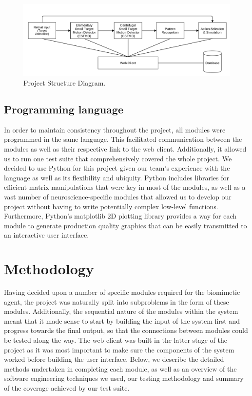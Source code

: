 \documentclass[a4paper,11pt]{article}
\begin{document}
\begin{figure}[h]
\centering
\includegraphics[scale = 0.35]{designblockdiagram2}
\caption{Project Structure Diagram.}
\end{figure}

\subsection{Programming language}
In order to maintain consistency throughout the project, all modules were programmed in the same language. This facilitated communication between the modules as well as their respective link to the web client. Additionally, it allowed us to run one test suite that comprehensively covered the whole project. We decided to use Python \cite{python} for this project given our team's experience with the language as well as its flexibility and ubiquity. Python includes libraries for efficient matrix manipulations that were key in most of the modules, as well as a vast number of neuroscience-specific modules that allowed us to develop our project without having to write potentially complex low-level functions. Furthermore, Python's matplotlib 2D plotting library provides a way for each module to generate production quality graphics that can be easily transmitted to an interactive user interface.


\clearpage
\section{Methodology}
Having decided upon a number of specific modules required for the biomimetic agent, the project was naturally split into subproblems in the form of these modules. Additionally, the sequential nature of the modules within the system meant that it made sense to start by building the input of the system first and progress towards the final output, so that the connections between modules could be tested along the way. The web client was built in the latter stage of the project as it was most important to make sure the components of the system worked before building the user interface. Below, we describe the detailed methods undertaken in completing each module, as well as an overview of the software engineering techniques we used, our testing methodology and summary of the coverage achieved by our test suite.
\end{document}
